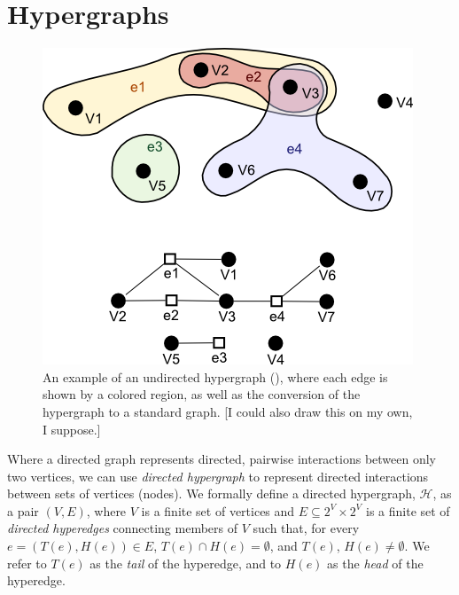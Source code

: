 \documentclass[12pt,twoside]{reedthesis}
\newcommand{\new}[2]{{\color{orange}#1 [#2]}}
\theoremstyle{definition}
\begin{document}
\section{Hypergraphs}

\begin{figure}[thbp]
  \begin{center}
    \includegraphics[width=\textwidth/2]{undirected_hypergraph}
  \caption[An example undirected hypergraph]{\new{An example of an undirected hypergraph (\cite{sharpen}), where each edge is shown by a colored region, as well as the conversion of the hypergraph to a standard graph.}{I could also draw this on my own, I suppose.}}
  \label{fig:undirected_hypergraph}
  \end{center}
\end{figure}

Where a directed graph represents directed, pairwise interactions between only two vertices, we can use \textit{directed hypergraph} to represent directed interactions between sets of vertices (nodes). We formally define a directed hypergraph, $\mathcal{H}$, as a pair $(V,E)$, where $V$ is a finite set of vertices and $E \subseteq 2^V \times 2^V$ is a finite set of \textit{directed hyperedges} connecting members of $V$ such that, for every $e=(T(e),H(e)) \in E$, $T(e) \cap H(e) = \emptyset$, and $T(e)$, $H(e) \neq \emptyset$.  We refer to $T(e)$ as the \textit{tail} of the hyperedge, and to $H(e)$ as the \textit{head} of the hyperedge.\par
\end{document}

